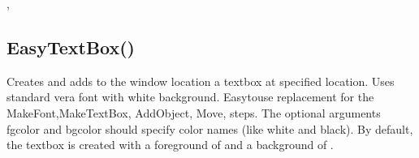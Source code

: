 \documentclass[letterpaper,10pt,english]{sphinxmanual}
\begin{document}
\sphinxAtStartPar
{}

\sphinxAtStartPar
{}, 

\ignorespaces 

\subsection{EasyTextBox()}
\label{\detokenize{reference/utility:easytextbox}}\label{\detokenize{reference/utility:index-7}}
\sphinxAtStartPar
{}

\sphinxAtStartPar
Creates and adds to the window location a textbox   at specified location. Uses standard vera font with white background.   Easy\sphinxhyphen{}to\sphinxhyphen{}use replacement for the MakeFont,MakeTextBox,   AddObject, Move, steps.    The optional arguments fgcolor and bgcolor should specify color names (like white and black).  By default, the textbox is created with a foreground of  and a background of .

\sphinxAtStartPar
{}

\begin{sphinxVerbatim}[commandchars=\\\{\}]
\end{sphinxVerbatim}

\sphinxAtStartPar
{}

\begin{sphinxVerbatim}[commandchars=\\\{\}]
\end{sphinxVerbatim}
\end{document}
